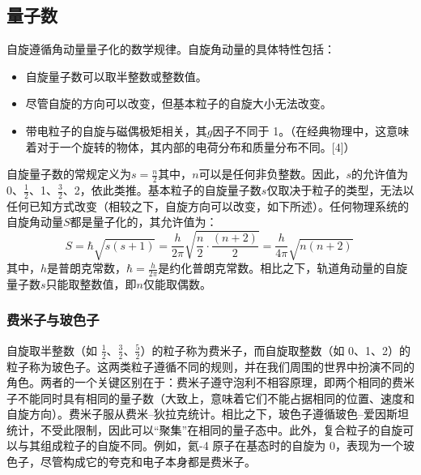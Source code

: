 \subsection{量子数} 
自旋遵循角动量量子化的数学规律。自旋角动量的具体特性包括：  
\begin{itemize}
\item 自旋量子数可以取半整数或整数值。  
\item 尽管自旋的方向可以改变，但基本粒子的自旋大小无法改变。  
\item 带电粒子的自旋与磁偶极矩相关，其\(g\)因子不同于 1。（在经典物理中，这意味着对于一个旋转的物体，其内部的电荷分布和质量分布不同。[4]）
\end{itemize}
自旋量子数的常规定义为\(s = \frac{n}{2}\)其中，\( n \)可以是任何非负整数。因此，\( s \)的允许值为 0、\( \frac{1}{2} \)、1、\( \frac{3}{2} \)、2，依此类推。基本粒子的自旋量子数\( s \)仅取决于粒子的类型，无法以任何已知方式改变（相较之下，自旋方向可以改变，如下所述）。任何物理系统的自旋角动量\( S \)都是量子化的，其允许值为：  
\[
S = \hbar \sqrt{s(s+1)} = \frac{h}{2\pi} \sqrt{\frac{n}{2} \cdot \frac{(n+2)}{2}} = \frac{h}{4\pi} \sqrt{n(n+2)}~
\]  
其中，\( h \)是普朗克常数，\( \hbar = \frac{h}{2\pi} \)是约化普朗克常数。相比之下，轨道角动量的自旋量子数\( s \)只能取整数值，即\( n \)仅能取偶数。
\subsubsection{费米子与玻色子} 
自旋取半整数（如 \( \frac{1}{2} \)、\( \frac{3}{2} \)、\( \frac{5}{2} \)）的粒子称为费米子，而自旋取整数（如 0、1、2）的粒子称为玻色子。这两类粒子遵循不同的规则，并在我们周围的世界中扮演不同的角色。两者的一个关键区别在于：费米子遵守泡利不相容原理，即两个相同的费米子不能同时具有相同的量子数（大致上，意味着它们不能占据相同的位置、速度和自旋方向）。费米子服从费米–狄拉克统计。相比之下，玻色子遵循玻色–爱因斯坦统计，不受此限制，因此可以“聚集”在相同的量子态中。此外，复合粒子的自旋可以与其组成粒子的自旋不同。例如，氦-4 原子在基态时的自旋为 0，表现为一个玻色子，尽管构成它的夸克和电子本身都是费米子。

